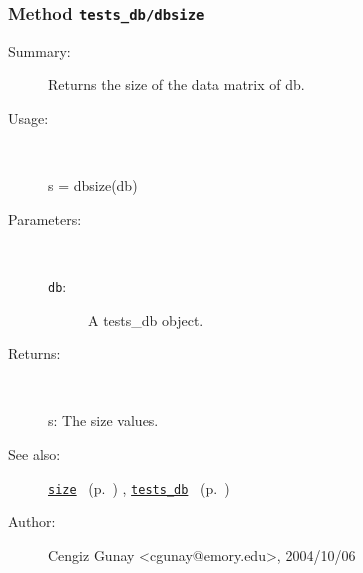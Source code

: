 \subsubsection[Method \texttt{dbsize}]{Method \texttt{tests\_db/dbsize}}%
%
\label{ref_tests_db__dbsize}%
\hypertarget{ref_tests_db__dbsize}{}%
\begin{description}
\item[Summary:]Returns the size of the data matrix of db.
%
\item[Usage:]~%
\begin{lyxcode}%
s = dbsize(db)
%
\end{lyxcode}%
%
%
\item[Parameters:]~
\begin{description}%
\item[\texttt{db}:]
 A tests\_db object.
\end{description}%
%
\item[Returns:
]~

	s: The size values.
%
%
\item[See also:]%
\hyperlink{ref_size}{\texttt{size}}%
\ (p.~\pageref{ref_size})%
%
, \hyperlink{ref_tests_db}{\texttt{tests\_db}}%
\ (p.~\pageref{ref_tests_db})%
%
%
\item[Author:]%
Cengiz Gunay <cgunay@emory.edu>, 2004/10/06
%
\end{description}
\methodline%
